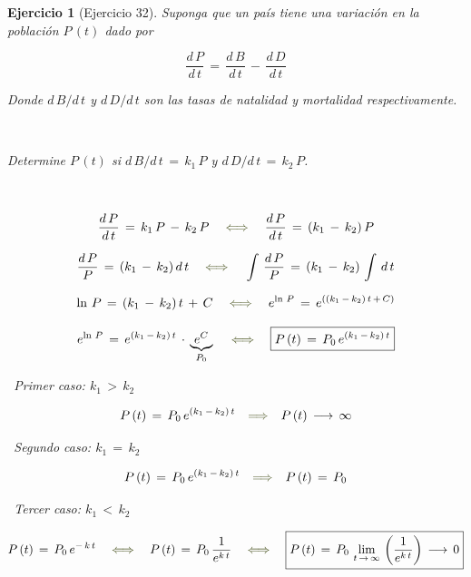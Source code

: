 \documentclass[a4paper,11pt]{book}
\newtheorem{ejer}{Ejercicio}[section]
\begin{document}
\begin{ejer}[Ejercicio 32]
 
Suponga que un país tiene una variación en la población $P\,(t)$ dado por
 
$$\boxed{\dfrac{d\,P}{d\,t}\,=\,\dfrac{d\,B}{d\,t}\,-\,\dfrac{d\,D}{d\,t}}$$ 
 
Donde $d\,B/d\,t$ y $d\,D/d\,t$ son las tasas de natalidad y mortalidad respectivamente.
 
\
 
Determine $P\,(t)$ si $d\,B/d\,t\,=\,k_{1}\,P$ y $d\,D/d\,t\,=\,k_{2}\,P$.
 
\ 
 
 
$$\dfrac{d\,P}{d\,t}\,=\,k_{1}\,P\,-\,k_{2}\,P \quad \textcolor{armygreen}{\iff} \quad \dfrac{d\,P}{d\,t}\,=\,(k_{1}\,-\,k_{2})\,P$$
 
$$\dfrac{d\,P}{P}\,=\,(k_{1}\,-\,k_{2})\,d\,t \quad \textcolor{armygreen}{\iff} \quad \int\,\dfrac{d\,P}{P}\,=\,(k_{1}\,-\,k_{2})\,\int\,d\,t$$
 
$$\ln\,P\,=\,(k_{1}\,-\,k_{2})\,t\,+\,C \quad \textcolor{armygreen}{\iff} \quad e^{\ln\,P}\,=\,e^{((k_{1}\,-\,k_{2})\,t\,+\,C ) }$$
 
$$e^{\ln\,P}\,=\,e^{(k_{1}\,-\,k_{2})\,t}\,\cdot\,\underbrace{e^{C}}_{P_{0}}\quad \textcolor{armygreen}{\iff} \quad \boxed{P\,(t)\,=\,P_{0}\,e^{(k_{1}\,-\,k_{2})\,t}}$$
 
\textcolor{armygreen}{\Writinghand}\, Primer caso: $\boxed{k_{1}\,>\,k_{2}}$
 
$$P\,(t)\,=\,P_{0}\,e^{(k_{1}\,-\,k_{2})\,t} \quad \textcolor{armygreen}{\Longrightarrow} \quad P\,(t) \, \longrightarrow \, \infty$$
 
\textcolor{armygreen}{\Writinghand}\, Segundo caso: $\boxed{k_{1}\,=\,k_{2}}$
 
$$P\,(t)\,=\,P_{0}\,e^{(k_{1}\,-\,k_{2})\,t} \quad \textcolor{armygreen}{\Longrightarrow} \quad P\,(t)\,=\,P_{0}$$
 
\textcolor{armygreen}{\Writinghand}\, Tercer caso: $\boxed{k_{1}\,<\,k_{2}}$
 
$$P\,(t)\,=\,P_{0}\,e^{-\,k\,t} \quad \textcolor{armygreen}{\iff} \quad P\,(t)\,=\,P_{0}\,\dfrac{1}{e^{k\,t}} \quad \textcolor{armygreen}{\iff} \quad \boxed{P\,(t)\,=\,P_{0}\,\lim_{t\,\rightarrow\,\infty}\,\left(\dfrac{1}{e^{k\,t}} \right) \, \longrightarrow \, 0}$$
 

\end{ejer} 
\end{document}
